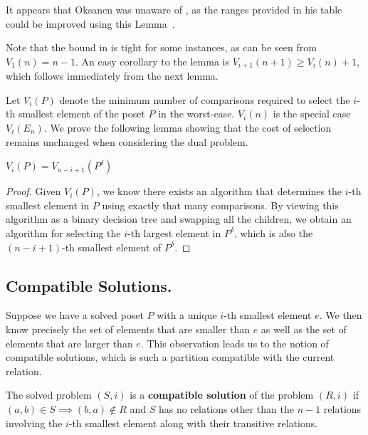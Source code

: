 \documentclass[a4paper,UKenglish,cleveref, autoref, thm-restate]{lipics-v2021}
\newcommand{\dual}[1]{{#1}^{\delta}}
\begin{document}
\begin{remark}
  It appears that Oksanen was unaware of , as the ranges provided in his table could be improved using this Lemma~\cite{Oksanen}.
\end{remark}

Note that the bound in  is tight for some instances, as can be seen from $V_1(n) = n - 1$.
An easy corollary to the lemma is $V_{i + 1}(n + 1) \geq V_i(n) + 1$, which follows immediately from the next lemma.

Let $V_i(P)$ denote the minimum number of comparisons required to select the $i$-th smallest element of the poset $P$ in the worst-case.
$V_i(n)$ is the special case $V_i(E_n)$.
We prove the following lemma showing that the cost of selection remains unchanged when considering the dual problem.

\begin{lemma} \label{lemma:dual_poset_allowed}
  $V_i(P) = V_{n - i + 1}(\dual{P})$
\end{lemma}

\begin{proof}
  Given $V_i(P)$, we know there exists an algorithm that determines the $i$-th smallest element in $P$ using exactly that many comparisons.
  By viewing this algorithm as a binary decision tree and swapping all the children, we obtain an algorithm for selecting the $i$-th largest element in $\dual{P}$, which is also the $(n - i + 1)$-th smallest element of $\dual{P}$.
\end{proof}

\subsection{Compatible Solutions.}
Suppose we have a solved poset $P$ with a unique $i$-th smallest element $e$.
We then know precisely the set of elements that are smaller than $e$ as well as the set of elements that are larger than $e$.
This observation leads us to the notion of compatible solutions, which is such a partition compatible with the current relation.

\begin{definition}
  The solved problem $(S, i)$ is a \textbf{compatible solution} of the problem $(R, i)$ if $(a, b) \in S \implies (b, a) \notin R$ and $S$ has no relations other than the $n - 1$ relations involving the $i$-th smallest element along with their transitive relations. 
\end{definition}
\end{document}
